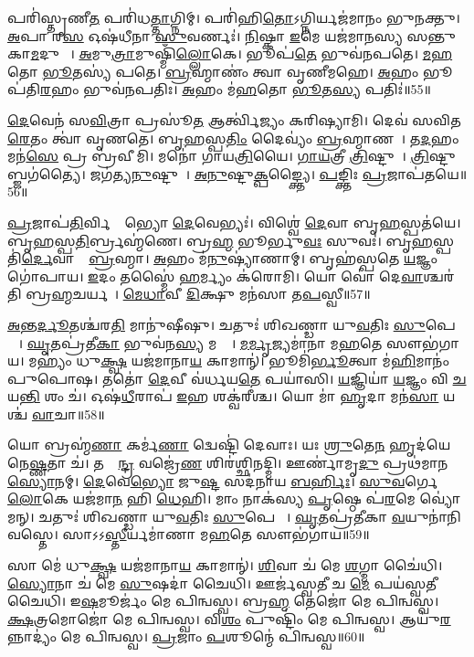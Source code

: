 𑌪𑌰𑌿॑𑌸𑍍𑌤𑍃𑌣𑍀\ul{𑌤} 𑌪𑌰𑌿॑𑌧\ul{𑌤𑍍𑌤𑌾}𑌗𑍍𑌨𑌿𑌮𑍍।
𑌪𑌰𑌿॑𑌹𑌿\ul{𑌤𑍋}\-𑌽𑌗𑍍𑌨𑌿𑌰𑍍𑌯𑌜॑𑌮𑌾𑌨𑌂 𑌭𑍁𑌨𑌕𑍍𑌤𑍁।
\ul{𑌅}𑌪𑌾 𑌰\ul{𑌸} 𑌓𑌷॑𑌧𑍀𑌨𑌾 \ul{𑌸𑍁}𑌵𑌰𑍍𑌣𑌃॑।
\ul{𑌨𑌿}𑌷𑍍𑌕𑌾 \ul{𑌇}𑌮𑍇 𑌯𑌜॑𑌮𑌾𑌨𑌸𑍍𑌯 𑌸𑌨𑍍𑌤𑍁 𑌕𑌾\ul{𑌮}𑌦𑍁𑌘𑌾𑌃᳚।
\ul{𑌅}𑌮𑍁\ul{𑌤𑍍𑌰𑌾}𑌮𑍁𑌷𑍍𑌮𑌿𑌁॑\ul{𑌲𑍍𑌲𑍋}𑌕𑍇।
𑌭𑍂𑌪॑\ul{𑌤𑍇} 𑌭𑍁𑌵॑𑌨𑌪𑌤𑍇।
\ul{𑌮}\ul{𑌹}𑌤𑍋 \ul{𑌭𑍂}𑌤𑌸𑍍𑌯॑ 𑌪𑌤𑍇।
\ul{𑌬𑍍𑌰}𑌹𑍍𑌮𑌾𑌣𑌂॑ 𑌤𑍍𑌵𑌾 𑌵𑍃𑌣𑍀𑌮𑌹𑍇।
\ul{𑌅}𑌹𑌂 𑌭𑍂𑌪॑𑌤𑌿\ul{𑌰}𑌹𑌂 𑌭𑍁𑌵॑𑌨𑌪𑌤𑌿𑌃।
\ul{𑌅}𑌹𑌂 𑌮॑\ul{𑌹}𑌤𑍋 \ul{𑌭𑍂}𑌤\ul{𑌸𑍍𑌯} 𑌪𑌤𑌿𑌃॑॥55॥

\ul{𑌦𑍇}𑌵𑍇𑌨॑ 𑌸\ul{𑌵𑌿}𑌤𑍍𑌰𑌾 𑌪𑍍𑌰𑌸𑍂॑\ul{𑌤} 𑌆𑌰𑍍𑌤𑍍𑌵𑌿॑𑌜𑍍𑌯𑌂 𑌕𑌰𑌿𑌷𑍍𑌯𑌾𑌮𑌿।
𑌦𑍇𑌵॑ 𑌸𑌵𑌿𑌤\ul{𑌰𑍇}𑌤𑌂 𑌤𑍍𑌵𑌾॑ 𑌵𑍃𑌣𑌤𑍇।
𑌬𑍃\ul{𑌹}𑌸𑍍𑌪\ul{𑌤𑌿𑌂} 𑌦𑍈𑌵𑍍𑌯𑌂॑ \ul{𑌬𑍍𑌰}𑌹𑍍𑌮𑌾𑌣𑌮𑍍᳚।
𑌤\ul{𑌦}𑌹𑌂 𑌮𑌨॑\ul{𑌸𑍇} 𑌪𑍍𑌰 𑌬𑍍𑌰॑𑌵𑍀𑌮𑌿।
𑌮𑌨𑍋॑ 𑌗𑌾𑌯\ul{𑌤𑍍𑌰𑌿}𑌯𑍈।
\ul{𑌗𑌾}\ul{𑌯}𑌤𑍍𑌰𑍀 \ul{𑌤𑍍𑌰𑌿}𑌷𑍍𑌟𑍁𑌭𑍇᳚।
\ul{𑌤𑍍𑌰𑌿}𑌷𑍍𑌟𑍁𑌬𑍍𑌜𑌗॑𑌤𑍍𑌯𑍈।
𑌜𑌗॑𑌤𑍍𑌯\ul{𑌨𑍁}𑌷𑍍𑌟𑍁𑌭𑍇᳚।
\ul{𑌅}\ul{𑌨𑍁}𑌷𑍍𑌟𑍁\ul{𑌕𑍍𑌪}𑌙𑍍𑌕𑍍𑌤𑍍𑌯𑍈।
\ul{𑌪}𑌙𑍍𑌕𑍍𑌤𑌿𑌃 \ul{𑌪𑍍𑌰}𑌜𑌾𑌪॑𑌤𑌯𑍇॥56॥

\ul{𑌪𑍍𑌰}𑌜𑌾𑌪॑\ul{𑌤𑌿}𑌰𑍍𑌵𑌿𑌶𑍍𑌵𑍇᳚𑌭𑍍𑌯𑍋 \ul{𑌦𑍇}𑌵𑍇𑌭𑍍𑌯𑌃॑।
𑌵𑌿𑌶𑍍𑌵𑍇॑ \ul{𑌦𑍇}𑌵𑌾 𑌬𑍃\ul{𑌹}𑌸𑍍𑌪𑌤॑𑌯𑍇।
𑌬𑍃\ul{𑌹}𑌸𑍍𑌪\ul{𑌤𑌿}𑌰𑍍𑌬𑍍𑌰𑌹𑍍𑌮॑𑌣𑍇।
𑌬𑍍𑌰\ul{𑌹𑍍𑌮} 𑌭𑍂𑌰𑍍𑌭𑍁\ul{𑌵𑌃} 𑌸𑍁𑌵𑌃॑।
𑌬𑍃\ul{𑌹}𑌸𑍍𑌪𑌤𑌿॑\ul{𑌰𑍍𑌦𑍇}𑌵𑌾𑌨𑌾𑌂᳚ \ul{𑌬𑍍𑌰}𑌹𑍍𑌮𑌾।
\ul{𑌅}𑌹𑌂 𑌮॑\ul{𑌨𑍁}𑌷𑍍𑌯𑌾॑𑌣𑌾𑌮𑍍।
𑌬𑍃𑌹॑𑌸𑍍𑌪𑌤𑍇 \ul{𑌯}𑌜𑍍𑌞𑌂 𑌗𑍋॑𑌪𑌾𑌯।
\ul{𑌇}𑌦𑌂 𑌤𑌸𑍍𑌮𑍈॑ \ul{𑌹}𑌰𑍍𑌮𑍍𑌯𑌂 𑌕॑𑌰𑍋𑌮𑌿।
𑌯𑍋 𑌵𑍋॑ 𑌦𑍇\ul{𑌵𑌾}𑌶𑍍𑌚𑌰॑𑌤𑌿 𑌬𑍍𑌰\ul{𑌹𑍍𑌮}𑌚𑌰𑍍𑌯𑌮𑍍᳚।
\ul{𑌮𑍇}\ul{𑌧𑌾}𑌵𑍀 \ul{𑌦𑌿}𑌕𑍍𑌷𑍁 𑌮𑌨॑𑌸𑌾 𑌤\ul{𑌪}𑌸𑍍𑌵𑍀॥57॥

\ul{𑌅}𑌨𑍍𑌤\ul{𑌰𑍍𑌦𑍂}𑌤𑌶𑍍𑌚॑𑌰\ul{𑌤𑌿} 𑌮𑌾𑌨𑍁॑𑌷𑍀𑌷𑍁।
𑌚𑌤𑍁𑌃॑ 𑌶𑌿𑌖𑌣𑍍𑌡𑌾 𑌯𑍁\ul{𑌵}𑌤𑌿𑌃 \ul{𑌸𑍁}𑌪𑍇𑌶𑌾𑌃᳚।
\ul{𑌘𑍃}𑌤𑌪𑍍𑌰॑𑌤𑍀\ul{𑌕𑌾} 𑌭𑍁𑌵॑𑌨\ul{𑌸𑍍𑌯} 𑌮𑌧𑍍𑌯𑍇᳚।
\ul{𑌮}\ul{𑌰𑍍𑌮𑍃}𑌜𑍍𑌯𑌮𑌾॑𑌨𑌾 𑌮\ul{𑌹}𑌤𑍇 𑌸𑍗𑌭॑𑌗𑌾𑌯।
𑌮𑌹𑍍𑌯𑌂॑ 𑌧𑍁\ul{𑌕𑍍𑌷𑍍𑌵} 𑌯𑌜॑𑌮𑌾𑌨𑌾\ul{𑌯} 𑌕𑌾𑌮𑌾𑌨𑍍॑।
𑌭𑍂𑌮𑌿॑\ul{𑌰𑍍𑌭𑍂}𑌤𑍍𑌵𑌾 𑌮॑\ul{𑌹𑌿}𑌮𑌾𑌨𑌂॑ 𑌪𑍁𑌪𑍋𑌷।
𑌤𑌤𑍋॑ \ul{𑌦𑍇}𑌵𑍀 𑌵॑𑌰𑍍𑌧𑌯\ul{𑌤𑍇} 𑌪𑌯𑌾॑𑌸𑌿।
\ul{𑌯}𑌜𑍍𑌞𑌿𑌯𑌾॑ \ul{𑌯}𑌜𑍍𑌞𑌂 𑌵𑌿 \ul{𑌚} 𑌯\ul{𑌨𑍍𑌤𑌿} 𑌶𑌂 𑌚॑।
𑌓𑌷॑\ul{𑌧𑍀}𑌰𑌾𑌪॑ \ul{𑌇}𑌹 𑌶𑌕𑍍𑌵॑𑌰𑍀𑌶𑍍𑌚।
𑌯𑍋 𑌮𑌾॑ \ul{𑌹𑍃}𑌦𑌾 𑌮𑌨॑\ul{𑌸𑌾} 𑌯𑌶𑍍𑌚॑ \ul{𑌵𑌾}𑌚𑌾॥58॥

𑌯𑍋 𑌬𑍍𑌰𑌹𑍍𑌮॑\ul{𑌣𑌾} 𑌕𑌰𑍍𑌮॑\ul{𑌣𑌾} 𑌦𑍍𑌵𑍇𑌷𑍍𑌟𑌿॑ 𑌦𑍇𑌵𑌾𑌃।
𑌯𑌃 \ul{𑌶𑍍𑌰𑍁}𑌤𑍇\ul{𑌨} 𑌹𑍃𑌦॑𑌯𑍇𑌨𑍇\ul{𑌷𑍍𑌣}𑌤𑌾 𑌚॑।
𑌤𑌸𑍍𑌯𑍇᳚\ul{𑌨𑍍𑌦𑍍𑌰} 𑌵𑌜𑍍𑌰𑍇॑\ul{𑌣} 𑌶𑌿𑌰॑𑌶𑍍𑌛𑌿𑌨𑌦𑍍𑌮𑌿।
𑌊𑌰𑍍𑌣𑌾॑𑌮𑍃\ul{𑌦𑍁} 𑌪𑍍𑌰𑌥॑𑌮𑌾𑌨 \ul{𑌸𑍍𑌯𑍋}𑌨𑌮𑍍।
\ul{𑌦𑍇}𑌵𑍇\ul{𑌭𑍍𑌯𑍋} 𑌜𑍁\ul{𑌷𑍍𑌟}\ul{} 𑌸𑌦॑𑌨𑌾𑌯 \ul{𑌬}\ul{𑌰𑍍}𑌹𑌿𑌃।
\ul{𑌸𑍁}\ul{𑌵}𑌰𑍍𑌗𑍇 \ul{𑌲𑍋}𑌕𑍇 𑌯𑌜॑𑌮𑌾\ul{𑌨}\ul{} 𑌹𑌿 \ul{𑌧𑍇}𑌹𑌿।
𑌮𑌾𑌂 𑌨𑌾𑌕॑𑌸𑍍𑌯 \ul{𑌪𑍃}𑌷𑍍𑌠𑍇 𑌪॑\ul{𑌰}𑌮𑍇 𑌵𑍍𑌯𑍋॑𑌮𑌨𑍍।
𑌚𑌤𑍁𑌃॑ 𑌶𑌿𑌖𑌣𑍍𑌡𑌾 𑌯𑍁\ul{𑌵}𑌤𑌿𑌃 \ul{𑌸𑍁}𑌪𑍇𑌶𑌾𑌃᳚।
\ul{𑌘𑍃}𑌤𑌪𑍍𑌰॑𑌤𑍀𑌕𑌾 \ul{𑌵}𑌯𑍁𑌨𑌾॑𑌨𑌿 𑌵𑌸𑍍𑌤𑍇।
𑌸𑌾𑌽𑌽\ul{𑌸𑍍𑌤𑍀}𑌰𑍍𑌯𑌮𑌾॑𑌣𑌾 𑌮\ul{𑌹}𑌤𑍇 𑌸𑍗𑌭॑𑌗𑌾𑌯॥59॥

𑌸𑌾 𑌮𑍇॑ 𑌧𑍁\ul{𑌕𑍍𑌷𑍍𑌵} 𑌯𑌜॑𑌮𑌾𑌨𑌾\ul{𑌯} 𑌕𑌾𑌮𑌾𑌨𑍍॑।
\ul{𑌶𑌿}𑌵𑌾 𑌚॑ 𑌮𑍇 \ul{𑌶}𑌗𑍍𑌮𑌾 𑌚𑍈॑𑌧𑌿।
\ul{𑌸𑍍𑌯𑍋}𑌨𑌾 𑌚॑ 𑌮𑍇 \ul{𑌸𑍁}𑌷𑌦𑌾॑ 𑌚𑍈𑌧𑌿।
𑌊𑌰𑍍𑌜॑𑌸𑍍𑌵𑌤𑍀 𑌚 \ul{𑌮𑍇} 𑌪𑌯॑𑌸𑍍𑌵𑌤𑍀 𑌚𑍈𑌧𑌿।
𑌇\ul{𑌷}𑌮𑍂𑌰𑍍𑌜𑌂॑ 𑌮𑍇 𑌪𑌿𑌨𑍍𑌵𑌸𑍍𑌵।
𑌬𑍍𑌰\ul{𑌹𑍍𑌮} 𑌤𑍇𑌜𑍋॑ 𑌮𑍇 𑌪𑌿𑌨𑍍𑌵𑌸𑍍𑌵।
\ul{𑌕𑍍𑌷}𑌤𑍍𑌰𑌮𑍋𑌜𑍋॑ 𑌮𑍇 𑌪𑌿𑌨𑍍𑌵𑌸𑍍𑌵।
𑌵𑌿\ul{𑌶𑌂} 𑌪𑍁𑌷𑍍𑌟𑌿𑌂॑ 𑌮𑍇 𑌪𑌿𑌨𑍍𑌵𑌸𑍍𑌵।
𑌆𑌯𑍁॑\ul{𑌰}𑌨𑍍𑌨𑌾𑌦𑍍𑌯𑌂॑ 𑌮𑍇 𑌪𑌿𑌨𑍍𑌵𑌸𑍍𑌵।
\ul{𑌪𑍍𑌰}𑌜𑌾𑌂 \ul{𑌪}𑌶𑍂𑌨𑍍𑌮𑍇॑ 𑌪𑌿𑌨𑍍𑌵𑌸𑍍𑌵॥60॥

